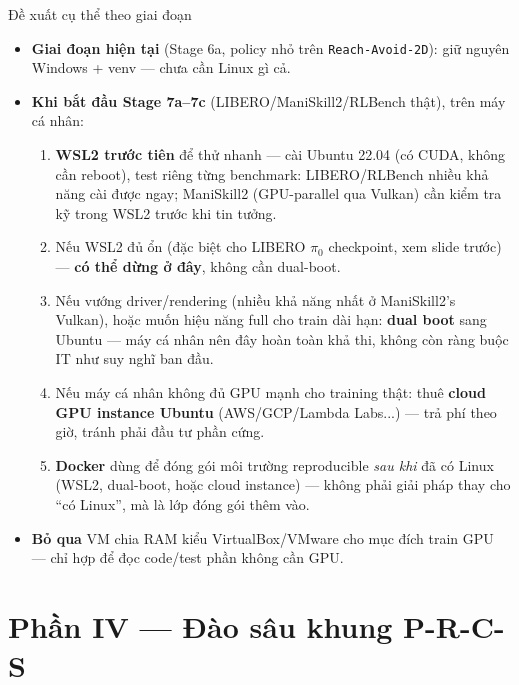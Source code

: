 \documentclass[aspectratio=169]{beamer}
\begin{document}
\begin{frame}[t,shrink=8]{Đề xuất cụ thể theo giai đoạn}
\begin{itemize}
    \item \textbf{Giai đoạn hiện tại} (Stage 6a, policy nhỏ trên \texttt{Reach-Avoid-2D}): giữ nguyên Windows + venv --- chưa cần Linux gì cả.
    \item \textbf{Khi bắt đầu Stage 7a--7c} (LIBERO/ManiSkill2/RLBench thật), trên máy cá nhân:
    \begin{enumerate}
        \item \textbf{WSL2 trước tiên} để thử nhanh --- cài Ubuntu 22.04 (có CUDA, không cần reboot), test riêng từng benchmark: LIBERO/RLBench nhiều khả năng cài được ngay; ManiSkill2 (GPU-parallel qua Vulkan) cần kiểm tra kỹ trong WSL2 trước khi tin tưởng.
        \item Nếu WSL2 đủ ổn (đặc biệt cho LIBERO $\pi_0$ checkpoint, xem slide trước) --- \textbf{có thể dừng ở đây}, không cần dual-boot.
        \item Nếu vướng driver/rendering (nhiều khả năng nhất ở ManiSkill2's Vulkan), hoặc muốn hiệu năng full cho train dài hạn: \textbf{dual boot} sang Ubuntu --- máy cá nhân nên đây hoàn toàn khả thi, không còn ràng buộc IT như suy nghĩ ban đầu.
        \item Nếu máy cá nhân không đủ GPU mạnh cho training thật: thuê \textbf{cloud GPU instance Ubuntu} (AWS/GCP/Lambda Labs...) --- trả phí theo giờ, tránh phải đầu tư phần cứng.
        \item \textbf{Docker} dùng để đóng gói môi trường reproducible \emph{sau khi} đã có Linux (WSL2, dual-boot, hoặc cloud instance) --- không phải giải pháp thay cho ``có Linux'', mà là lớp đóng gói thêm vào.
    \end{enumerate}
    \item \textbf{Bỏ qua} VM chia RAM kiểu VirtualBox/VMware cho mục đích train GPU --- chỉ hợp để đọc code/test phần không cần GPU.
\end{itemize}
\end{frame}

\section{Phần IV --- Đào sâu khung P-R-C-S}
\end{document}
